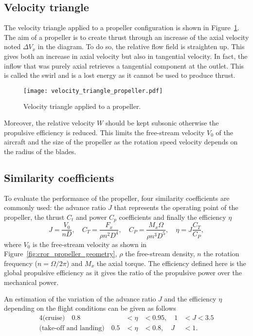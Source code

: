\subsection{Velocity triangle}
\label{sub:cror_propeller_velocity_triangle}
The velocity triangle applied to a propeller configuration
is shown in Figure~\ref{fig:cror_velocity_triangle_propeller}.
The aim of a propeller is to create thrust through an increase
of the axial velocity noted $\Delta V_x$ in the diagram. To do
so, the relative flow field is straighten up. This gives both
an increase in axial velocity but also in tangential velocity.
In fact, the inflow that was purely axial retrieves a tangential
component at the outlet. This is called the swirl and
is a lost energy as it cannot be used to produce thrust.
\begin{figure}[htp]
  \centering
  \texttt{[image: velocity\_triangle\_propeller.pdf]}
  \caption{Velocity triangle applied to a propeller.}
  \label{fig:cror_velocity_triangle_propeller}
\end{figure}
Moreover, the relative velocity $W$ should be kept subsonic
otherwise the propulsive efficiency is reduced. This limits
the free-stream velocity $V_0$ of the aircraft and the size of 
the propeller as the rotation speed velocity depends on
the radius of the blades.

\subsection{Similarity coefficients}
\label{sub:similarity_coefficients}
To evaluate the performance of the propeller, four similarity
coefficients are commonly used:
the advance ratio $J$ that represents the operating point of the propeller,
the thrust $C_t$ and power $C_p$ coefficients and finally
the efficiency $\eta$
\begin{equation}
    J = \frac{V_0}{n D}, \quad
    C_T = \frac{F_x}{\rho n ^ 2  D ^ 4}, \quad
    C_P = \frac{M_x \Omega}{\rho n ^ 3 D ^ 5}, \quad
    \eta = J \frac{C_T}{C_P},
\end{equation}
where $V_0$ is the free-stream velocity 
as shown in Figure~\ref{fig:cror_propeller_geometry},
$\rho$ the free-stream density,
$n$ the rotation frequency ($n = \Omega / 2 \pi$) and
$M_x$ the axial torque.
The efficiency defined here is the global propulsive efficiency
as it gives the ratio of the propulsive power over the mechanical power.

An estimation of the variation of the advance ratio $J$ and the 
efficiency $\eta$ depending on the flight conditions can 
be given as follows~\cite{Bousquet2012}
\begin{alignat}{4}
    \text{(cruise)} \quad  0.8 &< \eta &< 0.95, \quad 1 &< J < 3.5 \\
    \text{(take-off and landing)} \quad  0.5 &< \eta &< 0.8, \quad J &< 1.
    \label{eq:estimation_sim_coeff}
\end{alignat}

